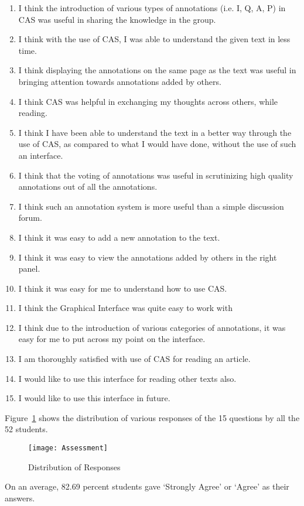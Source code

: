 \documentclass{llncs}
\begin{document}
\begin{enumerate}
\item I think the introduction of various types of annotations (i.e. I, Q, A, P) in CAS was useful in sharing the knowledge in the group. 
\item I think with the use of CAS, I was able to understand the given text in less time.
\item I think displaying the annotations on the same page as the text was useful in bringing attention towards annotations added by others.
\item I think CAS was helpful in exchanging my thoughts across others, while reading.
\item I  think I have been able to understand the text in a better way through the use of CAS, as compared to what I would have done, without the use of such an interface.
\item I think that the voting of annotations was useful in scrutinizing high quality annotations out of all the annotations.
\item I think such an annotation system is more useful than a simple discussion forum.
\item I think it was easy to add a new annotation to the text.
\item I think it was easy to view the annotations added by others in the right panel.
\item I think it was easy for me to understand how to use CAS.
\item I think the Graphical Interface was quite easy to work with
\item I think due to the introduction of various categories of annotations, it was easy for me to put across my point on the interface.
\item I am thoroughly satisfied with use of CAS for reading an article.
\item I would like to use this interface for reading other texts also.
\item I would like to use this interface in future.
\end{enumerate}
Figure~\ref{fig:Assessment} shows the distribution of various responses of the 15 questions by all the 52 students. 
\begin{figure}
\centering
\texttt{[image: Assessment]}
\caption{Distribution of Responses}
\label{fig:Assessment}
\end{figure}
On an average, 82.69 percent students gave `Strongly Agree' or `Agree' as their answers.\\
\end{document}
